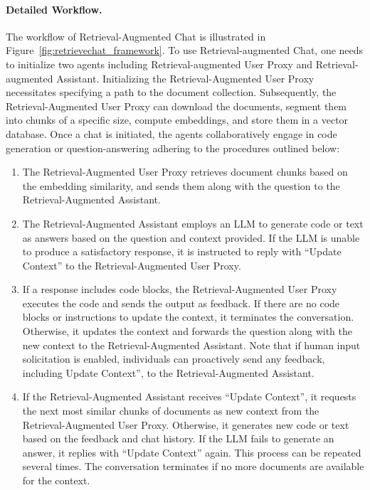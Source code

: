 \paragraph{Detailed Workflow.} \label{sec:app:retrieve:workflow}
 The workflow of Retrieval-Augmented Chat is illustrated in Figure~\ref{fig:retrievechat_framework}.  To use Retrieval-augmented Chat, one needs to initialize two agents including Retrieval-augmented User Proxy and Retrieval-augmented Assistant. Initializing the Retrieval-Augmented User Proxy necessitates specifying a path to the document collection. Subsequently, the Retrieval-Augmented User Proxy can download the documents, segment them into chunks of a specific size, compute embeddings, and store them in a vector database. Once a chat is initiated, the agents collaboratively engage in code generation or question-answering adhering to the procedures outlined below:
\begin{enumerate}[leftmargin=*]
    \vspace{-1mm}
    \setlength\itemsep{-0.1em}
    \item The Retrieval-Augmented User Proxy retrieves document chunks based on the embedding similarity, and sends them along with the question to the Retrieval-Augmented Assistant.
    \item The Retrieval-Augmented Assistant employs an LLM to generate code or text as answers based on the question and context provided. If the LLM is unable to produce a satisfactory response, it is instructed to reply with ``Update Context'' to the Retrieval-Augmented User Proxy.
    \item If a response includes code blocks, the Retrieval-Augmented User Proxy executes the code and sends the output as feedback. If there are no code blocks or instructions to update the context, it terminates the conversation. Otherwise, it updates the context and forwards the question along with the new context to the Retrieval-Augmented Assistant.
    Note that if human input solicitation is enabled, individuals can proactively send any feedback, including Update Context'', to the Retrieval-Augmented Assistant. 
\item If the Retrieval-Augmented Assistant receives ``Update Context'', it requests the next most similar chunks of documents as new context from the Retrieval-Augmented User Proxy. Otherwise, it generates new code or text based on the feedback and chat history. If the LLM fails to generate an answer, it replies with ``Update Context'' again. This process can be repeated several times. The conversation terminates if no more documents are available for the context.
\end{enumerate}

